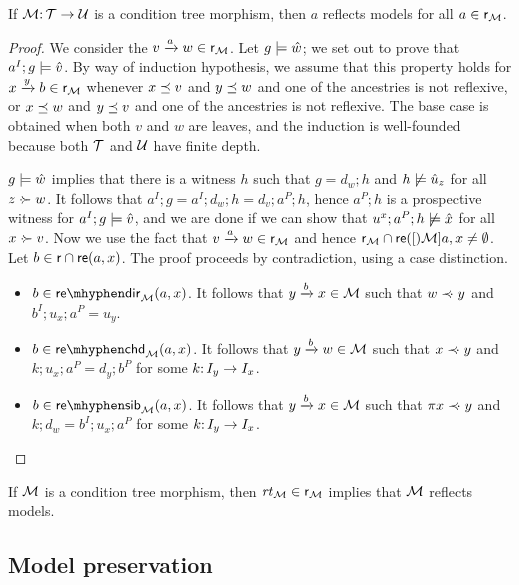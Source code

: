 \begin{lemma}\label{lem:reflection}
If ${\mathcal{M}}{:}\, {\mathcal{T}}\rightarrow {\mathcal{U}}$ is a condition tree morphism, then $a$ reflects models for all $a\in{\mathsf{r}}_{\mathcal{M}}$.
\end{lemma}
%
\begin{proof}
We consider the ${v}\xrightarrow{a}{w}\in {\mathsf{r}}_{\mathcal{M}}$. Let $g\models \hat w$; we set out to prove that $a^I;g\models \hat v$. By way of induction hypothesis, we assume that this property holds for ${x}\xrightarrow{y}{b}\in {\mathsf{r}}_{\mathcal{M}}$ whenever $x\preceq v$ and $y\preceq w$ and one of the ancestries is not reflexive, or $x\preceq w$ and $y\preceq v$ and one of the ancestries is not reflexive. The base case is obtained when both $v$ and $w$ are leaves, and the induction is well-founded because both ${\mathcal{T}}$ and ${\mathcal{U}}$ have finite depth.

$g\models \hat w$ implies that there is a witness $h$ such that $g=d_w;h$ and $h\not\models \hat u_z$ for all $z\mathrel{\cdot\mskip-8mu\succ} w$. It follows that $a^I;g=a^I;d_w;h=d_v;a^P;h$, hence $a^P;h$ is a prospective witness for $a^I;g\models \hat v$, and we are done if we can show that $u^x;a^P;h\not\models \hat x$ for all $x\mathrel{\cdot\mskip-8mu\succ} v$. Now we use the fact that ${v}\xrightarrow{a}{w}\in {\mathsf{r}}_{\mathcal{M}}$ and hence ${\mathsf{r}}_{\mathcal{M}}\cap \mathsf{re}([){\mathcal{M}}]{a,x}\neq \emptyset$. Let $b\in {\mathsf{r}} \cap \mathsf{re}(a,x)$. The proof proceeds by contradiction, using a case distinction.
\begin{itemize}
\item $b\in \sdir[\cM]{a,x}$. It follows that ${y}\xrightarrow{b}{x}\in{\mathcal{M}}$ such that $w\mathrel{\prec\mskip-8mu\cdot} y$ and $b^I;u_x;a^P=u_y$.

\item $b\in \schd[\cM]{a,x}$. It follows that ${y}\xrightarrow{b}{w}\in {\mathcal{M}}$ such that $x\mathrel{\prec\mskip-8mu\cdot} y$ and $k;u_x;a^P=d_y;b^P$ for some $k{:}\, I_y\rightarrow I_x$.

\item $b\in \ssib[\cM]{a,x}$. It follows that ${y}\xrightarrow{b}{x}\in {\mathcal{M}}$ such that $\pi{x}\mathrel{\prec\mskip-8mu\cdot} y$ and $k;d_w=b^I;u_x;a^P$ for some $k{:}\, I_y\rightarrow I_x$.
\end{itemize}
\end{proof}

\begin{corollary}
If ${\mathcal{M}}$ is a condition tree morphism, then $\mathit{rt}_{{\mathcal{M}}}\in {\mathsf{r}}_{\mathcal{M}}$ implies that ${\mathcal{M}}$ reflects models.
\end{corollary}

\subsection{Model preservation}

